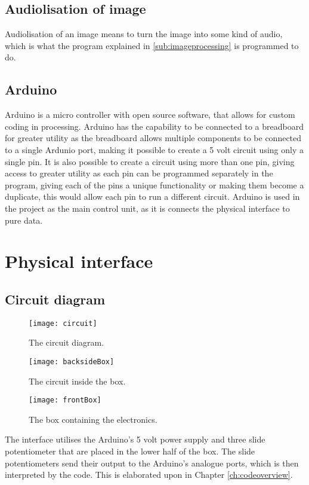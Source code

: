 	\subsection{Audiolisation of image}\label{sub:audiolisationofimage} 
	Audiolisation of an image means to turn the image into some kind of audio, which is what the program explained in \ref{sub:imageprocessing} is programmed to do. 
	
	\subsection{Arduino}\label{sub:arduino}
	Arduino is a micro controller with open source software, that allows for custom coding in processing. Arduino has the capability to be connected to a breadboard for greater utility as the breadboard allows multiple components to be connected to a single Ardunio port, making it possible to create a 5 volt circuit using only a single pin. It is also possible to create a circuit using more than one pin, giving access to greater utility as each pin can be programmed separately in the program, giving each of the pins a unique functionality or making them become a duplicate, this would allow each pin to run a different circuit.
	Arduino is used in the project as the main control unit, as it is connects the physical interface to pure data. 
	
\section{Physical interface}\label{sec:physicalinterface}

	
	\subsection{Circuit diagram}\label{sub:circuitdiagram}
\begin{figure}
\centering
\texttt{[image: circuit]}
\caption{The circuit diagram.}
\label{fig:circuit}
\end{figure}

\begin{figure}
\centering
\texttt{[image: backsideBox]}
\caption{The circuit inside the box.}
\label{fig:backsideBox}
\end{figure}

\begin{figure}
\centering
\texttt{[image: frontBox]}
\caption{The box containing the electronics.}
\label{fig:frontBox}
\end{figure}

	
	The interface utilises the Arduino's 5 volt power supply and three slide potentiometer that are placed in the lower half of the box. The slide potentiometers send their output to the Arduino's analogue ports, which is then interpreted by the code. This is elaborated upon in Chapter \ref{ch:codeoverview}.
